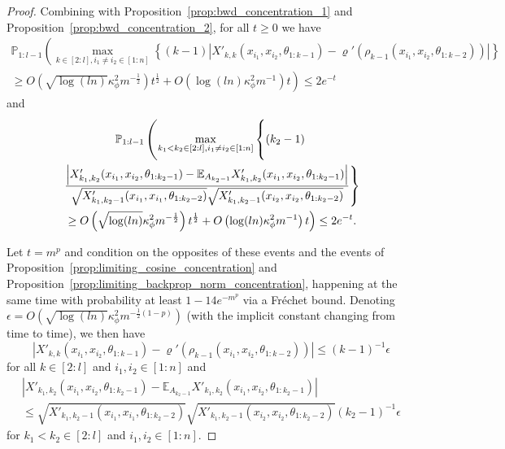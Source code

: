 \documentclass[twoside,11pt]{article}
\newcommand{\E}{\mathbb{E}}
\newcommand{\Prob}{\mathbb{P}}
\begin{document}
\begin{proof}
Combining \citet[Lemma~2.2.13]{Vandervaartetal2023} with Proposition~\ref{prop:bwd_concentration_1} and Proposition~\ref{prop:bwd_concentration_2}, for all $t \geq 0$ we have
\begin{multline*}
\Prob_{1:l-1}\left( \max_{k \in [2:l], i_1 \neq i_2 \in [1:n]}\left\{ (k-1) \left\vert X'_{k,k}(x_{i_1},x_{i_2},\theta_{1:k-1}) - \varrho'(\rho_{k-1}(x_{i_1},x_{i_2},\theta_{1:k-2})) \right\vert \right\} 
\right. \\ \left.
\geq O\left( \sqrt{\log(ln)} \kappa_\phi^2 m^{-\frac{1}{2}} \right) t^{\frac{1}{2}} 
+ O\left( \log(ln) \kappa_\phi^2 m^{-1} \right) t \right)
\leq 2e^{-t}
\end{multline*}
and
\begin{multline*}
\Prob_{1:l-1}\left( \max_{k_1 < k_2 \in [2:l], i_1 \neq i_2 \in [1:n]}\left\{ (k_2-1) 
\vphantom{\frac{\left\vert X'_{k_1,k_2}(x_{i_1},x_{i_2},\theta_{1:k_2-1}) - \E_{A_{k_2-1}} X'_{k_1,k_2}(x_{i_1},x_{i_2},\theta_{1:k_2-1}) \right\vert}{\sqrt{X'_{k_1,k_2-1}(x_{i_1},x_{i_1},\theta_{1:k_2-2})} \sqrt{X'_{k_1,k_2-1}(x_{i_2},x_{i_2},\theta_{1:k_2-2})}}} \right. \right. \\ \left. \left.
\frac{\left\vert X'_{k_1,k_2}(x_{i_1},x_{i_2},\theta_{1:k_2-1}) - \E_{A_{k_2-1}} X'_{k_1,k_2}(x_{i_1},x_{i_2},\theta_{1:k_2-1}) \right\vert}{\sqrt{X'_{k_1,k_2-1}(x_{i_1},x_{i_1},\theta_{1:k_2-2})} \sqrt{X'_{k_1,k_2-1}(x_{i_2},x_{i_2},\theta_{1:k_2-2})}} \right\} 
\right. \\ \left. 
\geq O\left( \sqrt{\log(ln)} \kappa_\phi^2 m^{-\frac{1}{2}} \right) t^{\frac{1}{2}} 
+ O\left( \log(ln) \kappa_\phi^2 m^{-1} \right) t \right)
\leq 2e^{-t}.
\end{multline*}

Let $t = m^p$ and condition on the opposites of these events and the events of Proposition~\ref{prop:limiting_cosine_concentration} and Proposition~\ref{prop:limiting_backprop_norm_concentration}, happening at the same time with probability at least $1 - 14e^{-m^p}$ via a Fr\'echet bound. Denoting $\epsilon = O\left( \sqrt{\log(ln)} \kappa_\phi^2 m^{-\frac{1}{2}(1-p)} \right)$ (with the implicit constant changing from time to time), we then have
\begin{equation}\label{eq:limiting_bwd_1_concentration}
\left\vert X'_{k,k}(x_{i_1},x_{i_2},\theta_{1:k-1}) - \varrho'(\rho_{k-1}(x_{i_1},x_{i_2},\theta_{1:k-2})) \right\vert
\leq (k-1)^{-1} \epsilon
\end{equation}
for all $k \in [2:l]$ and $i_1, i_2 \in [1:n]$ and
\begin{multline}\label{eq:limiting_bwd_2_concentration}
\left\vert X'_{k_1,k_2}(x_{i_1},x_{i_2},\theta_{1:k_2-1}) - \E_{A_{k_2-1}} X'_{k_1,k_2}(x_{i_1},x_{i_2},\theta_{1:k_2-1}) \right\vert \\
\leq \sqrt{X'_{k_1,k_2-1}(x_{i_1},x_{i_1},\theta_{1:k_2-2})} \sqrt{X'_{k_1,k_2-1}(x_{i_2},x_{i_2},\theta_{1:k_2-2})} (k_2-1)^{-1} \epsilon
\end{multline}
for $k_1 < k_2 \in [2:l]$ and $i_1, i_2 \in [1:n]$.


\end{proof}
\end{document}
